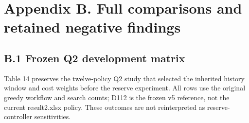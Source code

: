 \clearpage

\section*{Appendix B. Full comparisons and retained negative findings}\label{appendix-b.-full-comparisons-and-retained-negative-findings}

\subsection*{B.1 Frozen Q2 development matrix}\label{b.1-frozen-q2-development-matrix}

Table 14 preserves the twelve-policy Q2 study that selected the inherited history window and cost weights before the reserve experiment. All rows use the original greedy workflow and search counts; D112 is the frozen v5 reference, not the current result2.xlsx policy. These outcomes are not reinterpreted as reserve-controller sensitivities.

\Needspace{81.2pt}
\begingroup
\fontsize{8.6}{10.32}\selectfont
\setlength{\tabcolsep}{3.2pt}
\renewcommand{\arraystretch}{1.12}
\setlength{\LTleft}{0pt plus 1fill}\setlength{\LTright}{0pt plus 1fill}
\setlength{\LTcapwidth}{\linewidth}

